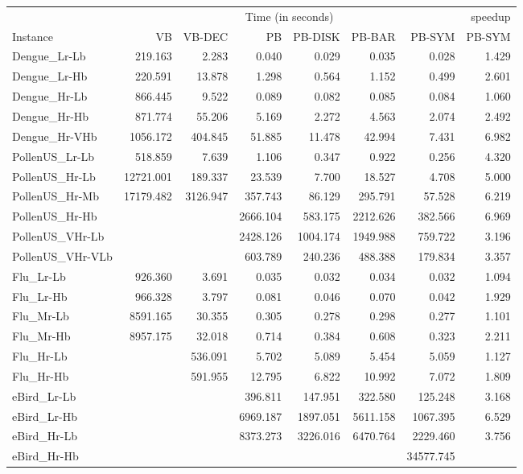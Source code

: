 \begin{tabular}{|l|rr|rrrr|r|}
\hline
& \multicolumn{6}{c|}{Time (in seconds)} & speedup\\
Instance & VB & VB-DEC & PB & PB-DISK & PB-BAR & PB-SYM & PB-SYM \\
\hline
Dengue\_Lr-Lb 	& 219.163 	& 2.283 	& 0.040 	& 0.029 	& 0.035 	& 0.028 	& 1.429 \\
Dengue\_Lr-Hb 	& 220.591 	& 13.878 	& 1.298 	& 0.564 	& 1.152 	& 0.499 	& 2.601 \\
Dengue\_Hr-Lb 	& 866.445 	& 9.522 	& 0.089 	& 0.082 	& 0.085 	& 0.084 	& 1.060 \\
Dengue\_Hr-Hb 	& 871.774 	& 55.206 	& 5.169 	& 2.272 	& 4.563 	& 2.074 	& 2.492 \\
Dengue\_Hr-VHb 	& 1056.172 	& 404.845 	& 51.885 	& 11.478 	& 42.994 	& 7.431 	& 6.982 \\
PollenUS\_Lr-Lb 	& 518.859 	& 7.639 	& 1.106 	& 0.347 	& 0.922 	& 0.256 	& 4.320 \\
PollenUS\_Hr-Lb 	& 12721.001 	& 189.337 	& 23.539 	& 7.700 	& 18.527 	& 4.708 	& 5.000 \\
PollenUS\_Hr-Mb 	& 17179.482 	& 3126.947 	& 357.743 	& 86.129 	& 295.791 	& 57.528 	& 6.219 \\
PollenUS\_Hr-Hb 	& 	& 	& 2666.104 	& 583.175 	& 2212.626 	& 382.566 	& 6.969 \\
PollenUS\_VHr-Lb 	& 	& 	& 2428.126 	& 1004.174 	& 1949.988 	& 759.722 	& 3.196 \\
PollenUS\_VHr-VLb 	& 	& 	& 603.789 	& 240.236 	& 488.388 	& 179.834 	& 3.357 \\
Flu\_Lr-Lb 	& 926.360 	& 3.691 	& 0.035 	& 0.032 	& 0.034 	& 0.032 	& 1.094 \\
Flu\_Lr-Hb 	& 966.328 	& 3.797 	& 0.081 	& 0.046 	& 0.070 	& 0.042 	& 1.929 \\
Flu\_Mr-Lb 	& 8591.165 	& 30.355 	& 0.305 	& 0.278 	& 0.298 	& 0.277 	& 1.101 \\
Flu\_Mr-Hb 	& 8957.175 	& 32.018 	& 0.714 	& 0.384 	& 0.608 	& 0.323 	& 2.211 \\
Flu\_Hr-Lb 	& 	& 536.091 	& 5.702 	& 5.089 	& 5.454 	& 5.059 	& 1.127 \\
Flu\_Hr-Hb 	& 	& 591.955 	& 12.795 	& 6.822 	& 10.992 	& 7.072 	& 1.809 \\
eBird\_Lr-Lb 	& 	& 	& 396.811 	& 147.951 	& 322.580 	& 125.248 	& 3.168 \\
eBird\_Lr-Hb 	& 	& 	& 6969.187 	& 1897.051 	& 5611.158 	& 1067.395 	& 6.529 \\
eBird\_Hr-Lb 	& 	& 	& 8373.273 	& 3226.016 	& 6470.764 	& 2229.460 	& 3.756 \\
eBird\_Hr-Hb 	& 	& 	& 	& 	& 	& 34577.745 	& \\
\hline
\end{tabular}
